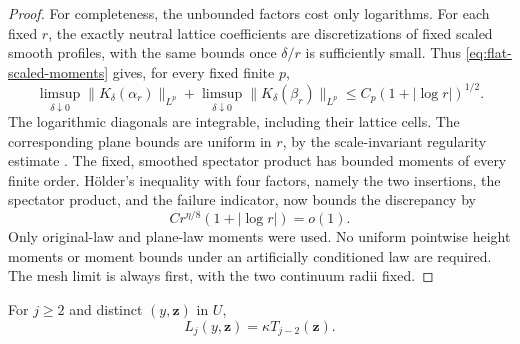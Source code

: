 \begin{proof}
For completeness, the unbounded factors cost only logarithms.
For each fixed \(r\), the exactly neutral lattice coefficients are
discretizations of fixed scaled smooth profiles, with the same bounds
once \(\delta/r\) is sufficiently small. Thus
\cref{eq:flat-scaled-moments} gives, for every fixed finite $p$,
\begin{equation}
 \limsup_{\delta\downarrow0}
 \|K_\delta(\alpha_r)\|_{L^p}
 +\limsup_{\delta\downarrow0}
 \|K_\delta(\beta_r)\|_{L^p}
 \leq C_p(1+|\log r|)^{1/2}.
 \label{eq:shrinking-smearing-moment}
\end{equation}
The logarithmic diagonals are integrable, including their lattice
cells. The corresponding plane bounds are uniform in $r$, by
the scale-invariant regularity estimate
\cite[Theorem~4.5]{DKLM2026}. The fixed, smoothed spectator product
has bounded moments of every finite order. H\"older's inequality
with four factors, namely the two insertions, the spectator product,
and the failure indicator, now bounds the discrepancy by
\[
                C r^{\eta/8}(1+|\log r|)=o(1).
\]
Only original-law and plane-law moments were used. No uniform
pointwise height moments or moment bounds under an artificially
conditioned law are required. The mesh limit is always first,
with the two continuum radii fixed.
\end{proof}

\begin{proposition}
\label{prop:collision-coefficient}
For $j\geq2$ and distinct $(y,\mathbf z)$ in $U$,
\begin{equation}
                    L_j(y,\mathbf z)=\kappa T_{j-2}(\mathbf z).
 \label{eq:collision-coefficient}
\end{equation}
\end{proposition}

